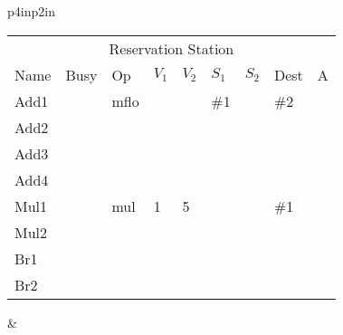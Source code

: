 \begin{tabular}{p{4in}p{2in}}
\noindent
\begin{tabular}{lllllllll}
\multicolumn{9}{c}{Reservation Station} \\
Name & Busy & Op   & $V_1$ & $V_2$ & $S_1$ & $S_2$ & Dest & A \\ \hline
Add1 &      & mflo &       &       & \#1   &       & \#2  &   \\
Add2 &      &      &       &       &       &       &      &   \\
Add3 &      &      &       &       &       &       &      &   \\
Add4 &      &      &       &       &       &       &      &   \\ \hline
Mul1 &      & mul  & 1     & 5     &       &       & \#1  &   \\
Mul2 &      &      &       &       &       &       &      &   \\ \hline
Br1  &      &      &       &       &       &       &      &   \\
Br2  &      &      &       &       &       &       &      &   \\
\end{tabular} & \\
\end{tabular}






